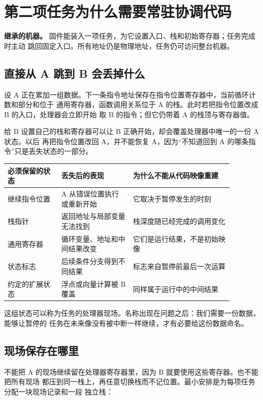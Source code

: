 \chapter{第二项任务为什么需要常驻协调代码}

\begin{statebox}
\textbf{继承的机器。} 固件能装入一项任务，为它设置入口、栈和初始寄存器；任务完成时主动
跳回固定入口。所有地址仍是物理地址，任务仍可访问整台机器。
\end{statebox}

\section{直接从 A 跳到 B 会丢掉什么}

设 A 正在累加一组数据。下一条指令地址保存在指令位置寄存器中，当前循环计数和部分和位于
通用寄存器，函数调用关系位于 A 的栈。此时若把指令位置改成 B 的入口，处理器会立即开始
取 B 的指令；但它仍带着 A 的栈顶与寄存器值。

给 B 设置自己的栈和寄存器可以让 B 正确开始，却会覆盖处理器中唯一的一份 A 状态。以后
再把指令位置改回 A，并不能恢复 A，因为“不知道回到 A 的哪条指令”只是丢失状态的一部分。

\begin{longtable}{|L{0.21\linewidth}|L{0.28\linewidth}|L{0.39\linewidth}|}
\hline
{}
必须保留的状态 & 丢失后的表现 & 为什么不能从代码映像重建 \\ \hline
继续指令位置 & A 从错误位置执行或重新开始 & 它取决于暂停发生的时刻 \\ \hline
栈指针 & 返回地址与局部变量无法找到 & 栈深度随已经完成的调用变化 \\ \hline
通用寄存器 & 循环变量、地址和中间结果改变 & 它们是运行结果，不是初始映像 \\ \hline
状态标志 & 后续条件分支得到不同结果 & 标志来自暂停前最后一次运算 \\ \hline
约定的扩展状态 & 浮点或向量计算被 B 覆盖 & 同样属于运行中的中间结果 \\ \hline
\end{longtable}

这组状态可以称为任务的处理器现场。名称出现在问题之后：我们需要一份数据，能够让暂停的
任务在未来像没有被中断一样继续，才有必要给这份数据命名。

\section{现场保存在哪里}

不能把 A 的现场继续留在处理器寄存器里，因为 B 就要使用这些寄存器。也不能把所有现场
都压到同一栈上，再任意切换栈而不记位置。最小安排是为每项任务分配一块现场记录和一段
独立栈：

